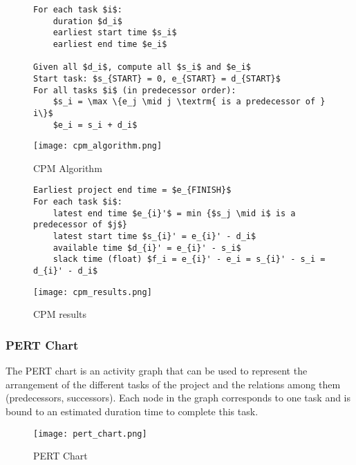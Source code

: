 \begin{figure}[!ht]
\begin{minipage}[t]{\linewidth}
    \begin{minipage}[c]{0.6\linewidth}
        \begin{lstlisting}[mathescape, frame=single, caption={CPM Algorithm},captionpos=b]
For each task $i$:
    duration $d_i$
    earliest start time $s_i$
    earliest end time $e_i$

Given all $d_i$, compute all $s_i$ and $e_i$
Start task: $s_{START} = 0, e_{START} = d_{START}$
For all tasks $i$ (in predecessor order):
    $s_i = \max \{e_j \mid j \textrm{ is a predecessor of } i\}$
    $e_i = s_i + d_i$
        \end{lstlisting}
    \end{minipage}
    \begin{minipage}[c]{0.35\linewidth}
        \texttt{[image: cpm\_algorithm.png]}
        \caption{CPM Algorithm}
    \end{minipage}
\end{minipage}
    \begin{minipage}{0.8\linewidth}
		\begin{lstlisting}[mathescape, frame=single, caption={CPM results}, captionpos=b]
Earliest project end time = $e_{FINISH}$
For each task $i$:
	latest end time $e_{i}'$ = min {$s_j \mid i$ is a predecessor of $j$}
	latest start time $s_{i}' = e_{i}' - d_i$
	available time $d_{i}' = e_{i}' - s_i$
	slack time (float) $f_i = e_{i}' - e_i = s_{i}' - s_i = d_{i}' - d_i$
		\end{lstlisting}
		\centering
    \texttt{[image: cpm\_results.png]}
    \caption{CPM results}
	\end{minipage}
\end{figure}
\FloatBarrier{}

\subsubsection{PERT Chart}

The PERT chart is an activity graph that can be used to represent the
arrangement of the different tasks of the project and the relations
among them (predecessors, successors). Each node in the graph
corresponds to one task and is bound to an estimated duration time to
complete this task.

\begin{figure}[!ht]
    \centering
    \texttt{[image: pert\_chart.png]}
    \caption{PERT Chart}
\end{figure}
\FloatBarrier{}

